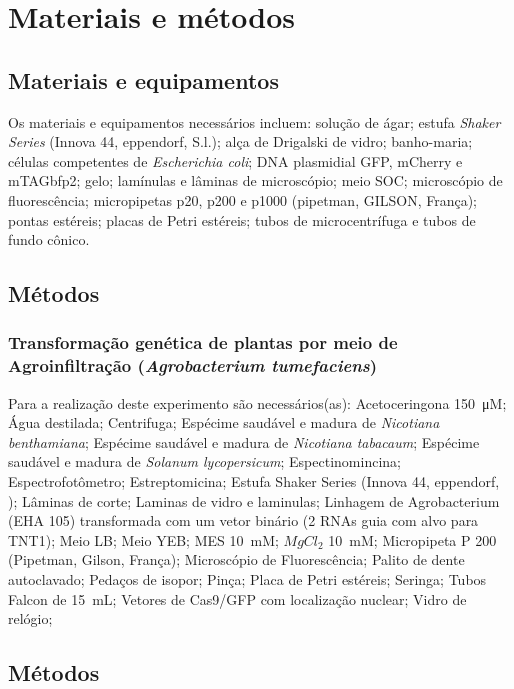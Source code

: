 \section{Materiais e métodos}
\subsection{Materiais e equipamentos}
Os materiais e equipamentos necessários incluem: solução de ágar; estufa
\textit{Shaker Series} (Innova 44, eppendorf, S.l.); alça de Drigalski de vidro;
banho-maria; células competentes de \textit{Escherichia coli}; DNA plasmidial
GFP, mCherry e mTAGbfp2; gelo; lamínulas e lâminas de microscópio; meio SOC;
microscópio de fluorescência; micropipetas p20, p200 e p1000 (pipetman, GILSON,
França); pontas estéreis; placas de Petri estéreis; tubos de microcentrífuga e
tubos de fundo cônico.

\subsection{Métodos}
\subsubsection {Transformação genética de plantas por meio de Agroinfiltração (\textit{Agrobacterium tumefaciens})}

Para a realização deste experimento são necessários(as): Acetoceringona \qty{150}{\micro M}; Água destilada; Centrifuga; Espécime saudável e madura de \textit{Nicotiana benthamiana}; Espécime saudável e madura de \textit{Nicotiana tabacaum}; Espécime saudável e madura de \textit{Solanum lycopersicum}; Espectinomincina;
Espectrofotômetro; Estreptomicina; Estufa Shaker Series (Innova 44, eppendorf, ); Lâminas de corte; Laminas de vidro e laminulas; Linhagem de Agrobacterium (EHA 105) transformada com um vetor binário (2 RNAs guia com alvo para TNT1); Meio LB; Meio YEB; MES \qty{10}{mM}; $MgCl_2$ \qty{10}{mM}; Micropipeta P 200 (Pipetman, Gilson, França); Microscópio de Fluorescência; Palito de dente autoclavado; Pedaços de isopor; Pinça; Placa de Petri estéreis; Seringa; Tubos Falcon de \qty{15}{mL}; Vetores de Cas9/GFP com localização nuclear; Vidro de relógio; 


\subsection{Métodos}
